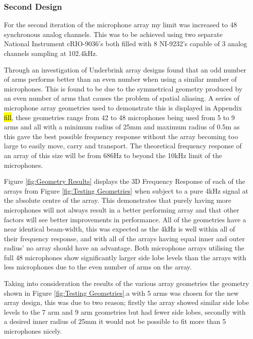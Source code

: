 \documentclass{UoNMCHA}
\numberwithin{equation}{section}
\begin{document}
\subsubsection{Second Design} \label{sec:Second Array Design}
    For the second iteration of the microphone array my limit was increased to 48 synchronous analog channels. This was to be achieved using two separate National Instrument cRIO-9036's both filled with 8 NI-9232's capable of 3 analog channels sampling at 102.4kHz.
    
    Through an investigation of Underbrink array designs found that an odd number of arms performs better than an even number when using a similar number of microphones. This is found to be due to the symmetrical geometry produced by an even number of arms that causes the problem of spatial aliasing. A series of microphone array geometries used to demonstrate this is displayed in Appendix \hl{fill}, these geometries range from 42 to 48 microphones being used from 5 to 9 arms and all with a minimum radius of 25mm and maximum radius of 0.5m as this gave the best possible frequency response without the array becoming too large to easily move, carry and transport. The theoretical frequency response of an array of this size will be from 686Hz to beyond the 10kHz limit of the microphones.
    
    Figure \ref{fig:Geometry Results} displays the 3D Frequency Response of each of the arrays from Figure \ref{fig:Testing Geometries} when subject to a pure 4kHz signal at the absolute centre of the array. This demonstrates that purely having more microphones will not always result in a better performing array and that other factors will see better improvements in performance. All of the geometries have a near identical beam-width, this was expected as the 4kHz is well within all of their frequency response, and with all of the arrays having equal inner and outer radius' no array should have an advantage. Both microphone arrays utilising the full 48 microphones show significantly larger side lobe levels than the arrays with less microphones due to the even number of arms on the array.
    
    Taking into consideration the results of the various array geometries the geometry shown in Figure \ref{fig:Testing Geometries}.a with 5 arms was chosen for the new array design, this was due to two reason; firstly the array showed similar side lobe levels to the 7 arm and 9 arm geometries but had fewer side lobes, secondly with a desired inner radius of 25mm it would not be possible to fit more than 5 microphones nicely.
        
\end{document}
